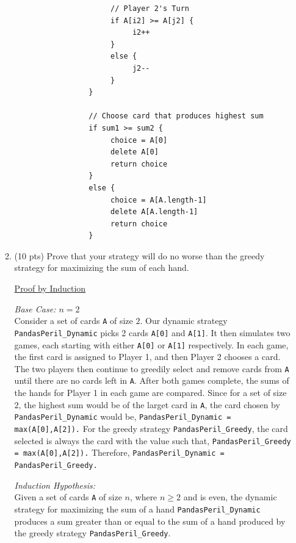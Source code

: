 \documentclass[12pt]{article}
\begin{document}
\begin{enumerate}
\begin{enumerate}
{\begin{small}
\begin{verbatim}
			          // Player 2's Turn
			          if A[i2] >= A[j2] {
			               i2++
			          }
			          else {
			               j2--
			          }
			     }

			     // Choose card that produces highest sum
			     if sum1 >= sum2 {
			          choice = A[0]
			          delete A[0]
			          return choice
			     }
			     else {
			          choice = A[A.length-1]
			          delete A[A.length-1]
			          return choice
			     }
		\end{verbatim}
		\end{small}
	}

\item (10 pts) Prove that your strategy will do no worse than the greedy strategy for maximizing the sum of each hand.

	{\color{blue}
		\underline{Proof by Induction}

		\emph{Base Case: $n=2$}\\
		Consider a set of cards \texttt{A} of size $2$. Our dynamic strategy \texttt{PandasPeril\_Dynamic} picks 2 cards \texttt{A[0]} and \texttt{A[1]}. It then simulates two games, each starting with either \texttt{A[0]} or \texttt{A[1]} respectively. In each game, the first card is assigned to Player 1, and then Player 2 chooses a card. The two players then continue to greedily select and remove cards from \texttt{A} until there are no cards left in \texttt{A}. After both games complete, the sums of the hands for Player 1 in each game are compared. Since for a set of size $2$, the highest sum would be of the larget card in \texttt{A}, the card chosen by \texttt{PandasPeril\_Dynamic} would be,
		{\center \texttt{PandasPeril\_Dynamic = max(A[0],A[2]).} \endcenter}
		For the greedy strategy \texttt{PandasPeril\_Greedy}, the card selected is always the card with the value such that,
		{\center \texttt{PandasPeril\_Greedy = max(A[0],A[2]).} \endcenter}
		Therefore,
		{\center \texttt{PandasPeril\_Dynamic = PandasPeril\_Greedy.} \endcenter}

		\emph{Induction Hypothesis:}\\
		Given a set of cards \texttt{A} of size $n$, where $n \geq 2$ and is even, the dynamic strategy for maximizing the sum of a hand \texttt{PandasPeril\_Dynamic} produces a sum greater than or equal to the sum of a hand produced by the greedy strategy \texttt{PandasPeril\_Greedy}.\\

}
\end{enumerate}
\end{enumerate}
\end{document}

